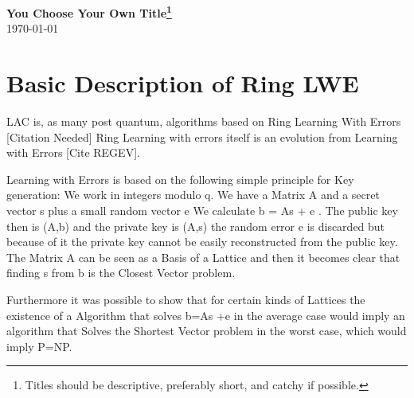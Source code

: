 \documentclass[11pt,twoside]{article}
\begin{document}

\newcommand{\gptitle}[1]{
  \begin{center}
    {\LARGE\textbf{#1}}\\
    \medskip
    \today
  \end{center}

  \thispagestyle{fancy}
}


\gptitle{You Choose Your Own Title\footnote{Titles should be
    descriptive, preferably short, and catchy if possible.}}

\begin{abstract}
  An abstract should be short and invite the reader to actually read
  the content of your analysis. You may mention what your findings
  are, but you should not say how you reached your conclusions
  here. Including too much information is a common mistake that can be
  found even in reputable researchers' papers. Simple is good.
\end{abstract}

\section{Basic Description of Ring LWE}
LAC is, as many post quantum, algorithms based on Ring Learning With Errors [Citation Needed]
Ring Learning with errors itself is an evolution from Learning with Errors [Cite REGEV].

Learning with Errors is based on the following simple principle for Key generation:
We work in integers modulo q. We have a Matrix A and a secret vector s plus a small random vector e
We calculate b = As + e . The public key then is (A,b) and the private key is (A,s) the random error e is discarded but because of it the private key cannot be easily reconstructed from the public key. The Matrix A can be seen as a Basis of a Lattice and then it becomes clear that finding s from b is the Closest Vector problem.

Furthermore it was possible to show that for certain kinds of Lattices the existence of a Algorithm that solves b=As +e in the average case would imply an algorithm that Solves the Shortest Vector problem in the worst case, which would imply P=NP.
\end{document}
